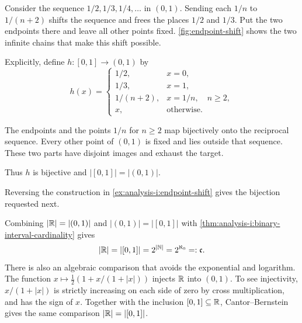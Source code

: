 \begin{example}
  \label{ex:analysis-i:endpoint-shift}
  Consider the sequence $1/2,1/3,1/4,\ldots$ in $(0,1)$.
  Sending each $1/n$ to $1/(n+2)$ shifts the sequence and frees the
  places $1/2$ and $1/3$. Put the two endpoints there and leave all
  other points fixed.
  \autoref{fig:endpoint-shift} shows the two infinite
  chains that make this shift possible.

  Explicitly, define $h:[0,1]\to(0,1)$ by
  \[
    h(x)=
    \begin{cases}
      1/2,&x=0,\\
      1/3,&x=1,\\
      1/(n+2),&x=1/n,\quad n\ge2,\\
      x,&\text{otherwise}.
    \end{cases}
  \]
  \begin{marginfigure}
    \centering
    
    \caption[Making room for two endpoints.]{Each arrow
      applies $h$. Shifting the even- and odd-denominator chains makes room
      for $0$ and $1$ at $1/2$ and $1/3$. Every other interior point stays
      fixed.}
    \label{fig:endpoint-shift}
  \end{marginfigure}


  The endpoints and the points $1/n$ for $n\ge2$ map bijectively onto
  the reciprocal sequence. Every other point of $(0,1)$ is fixed and
  lies outside that sequence. These two parts have disjoint images
  and exhaust the target.

  Thus $h$ is bijective and $|[0,1]|=|(0,1)|$.
\end{example}

Reversing the construction in
\autoref{ex:analysis-i:endpoint-shift} gives the bijection requested next.


Combining $|\mathbb{R}|=|(0,1)|$ and $|(0,1)|=|[0,1]|$ with
\autoref{thm:analysis-i:binary-interval-cardinality} gives
\[
  |\mathbb{R}|=|[0,1]|=2^{|\mathbb{N}|}=2^{\aleph_0}=:\mathfrak c.
\]
There is also an algebraic comparison that avoids
the exponential and logarithm.
The function $x\mapsto\tfrac12(1+x/(1+|x|))$ injects $\mathbb{R}$ into $(0,1)$.
To see injectivity, $x/(1+|x|)$ is strictly increasing on each side of zero
by cross multiplication, and has the sign of $x$. Together with the
inclusion $[0,1]\subseteq\mathbb{R}$, Cantor--Bernstein
gives the same comparison $|\mathbb{R}|=|[0,1]|$.


